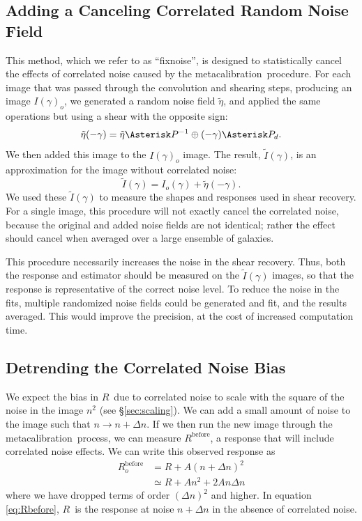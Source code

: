 \documentclass[usegraphicx,usenatbib]{mn2e}
\newcommand{\mcal}{metacalibration}
\newcommand{\mcalR}{$R$}
\newcommand{\fixnoise}{fixnoise}
\begin{document}
\subsection{Adding a Canceling Correlated Random Noise Field} \label{sec:fixnoise}

This method, which we refer to as ``\fixnoise'', is designed to statistically
cancel the effects of correlated noise caused by the \mcal\ procedure.  For each
image that was passed through the convolution and shearing steps, producing
an image $I(\gamma)_o$, we generated a random noise field
$\tilde{\eta}$, and applied the same operations but using a shear with
the opposite sign:
\begin{equation}
    \tilde{\eta}(-\gamma) = \tilde{\eta} \Asterisk P^{-1} \oplus (-\gamma) \Asterisk P_{d}.
\end{equation}
We then added this image to the $I(\gamma)_o$ image.
The result, $\tilde{I}(\gamma)$, is an approximation for the image
without correlated noise:
\begin{equation}
    \tilde{I}(\gamma) = I_o(\gamma) + \tilde{\eta}(-\gamma).
\end{equation}
We used these $\tilde{I}(\gamma)$ to measure the shapes and responses used in
shear recovery.  For a single image, this procedure will not exactly cancel the
correlated noise, because the original and added noise fields are not
identical; rather the effect should cancel when averaged over a large ensemble
of galaxies.

This procedure necessarily increases the noise in the shear recovery.  Thus,
both the response and estimator should be measured on the $\tilde{I}(\gamma)$
images, so that the response is representative of the correct noise level.  To
reduce the noise in the fits, multiple randomized noise fields could be
generated and fit, and the results averaged.  This would improve the precision,
at the cost of increased computation time.

\subsection{Detrending the Correlated Noise Bias} \label{sec:detrend}

We expect the bias in \mcalR\ due to correlated noise to scale with the square
of the noise in the image $n^2$ (see \S \ref{sec:scaling}).  We can add a small
amount of noise to the image such that $n \rightarrow n + \Delta n$.  If we
then run the new image through the \mcal\ process, we can measure
$R^{\mathrm{before}}$, a response that will include correlated noise effects.
We can write this observed response as
\begin{align}\label{eq:Rbefore}
    R_o^{\mathrm{before}} &= R + A (n + \Delta n)^2 \nonumber \\
       &\simeq R + A n^2 + 2 A n \Delta n
\end{align}
where we have dropped terms of order $(\Delta n)^2$ and higher.  In equation
\ref{eq:Rbefore}, \mcalR\ is the response at noise $n+\Delta n$ in the absence
of correlated noise.  
\end{document}
